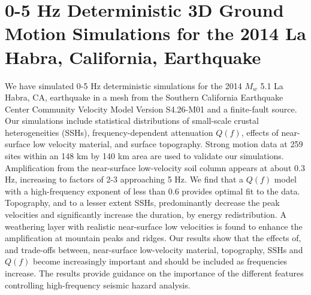 \newcommand{\red}[1]{\textcolor{red}{#1}}
\newcommand{\blue}[1]{\textcolor{blue}{#1}}
\newcommand{\green}[1]{\textcolor{green}{#1}}
\newcommand{\purple}[1]{\textcolor{purple}{#1}}

\linespread{1.7}
\chapter{0-5 Hz Deterministic 3D Ground Motion Simulations for the 2014 La Habra, California, Earthquake}
\linespread{2.0}
\label{chap:highf}

\graphicspath{{/Users/zhh076/work/PhD_way/high_f/}}

We have simulated 0-5 Hz deterministic simulations for the 2014 $M_w$ 5.1 La Habra, CA, earthquake in a mesh from the Southern California Earthquake Center Community Velocity Model Version S4.26-M01 and a finite-fault source. Our simulations include statistical distributions of small-scale crustal heterogeneities (SSHs), frequency-dependent attenuation $Q(f)$, effects of near-surface low velocity material, and surface topography. Strong motion data at 259 sites within an 148 km by 140 km area are used to validate our simulations.  Amplification from the near-surface low-velocity soil column appears at about 0.3 Hz, increasing to factors of 2-3 approaching 5 Hz. 
We find that a $Q(f)$ model with a high-frequency exponent of less than 0.6
provides optimal fit to the data. Topography, and to a lesser extent SSHs, predominantly decrease the peak velocities and significantly increase the duration, by energy redistribution. A weathering layer with realistic near-surface low velocities is found to enhance the amplification at mountain peaks and ridges. Our results show that the effects of, and trade-offs between, near-surface low-velocity material, topography, SSHs and $Q(f)$ become increasingly important and should be included as frequencies increase. The results provide guidance on the importance of the different features controlling high-frequency seismic hazard analysis.


